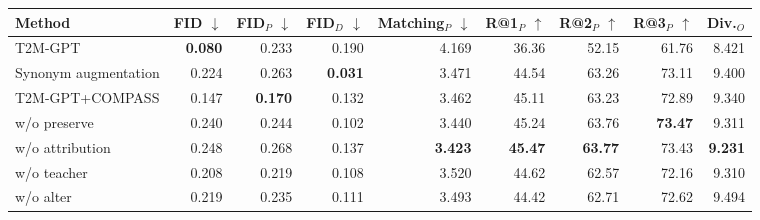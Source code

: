 \begin{tabular*}{\textwidth}{@{\extracolsep{\fill}}lrrrrrrrr@{}}
\toprule
Method & FID $\downarrow$ & FID$_P$ $\downarrow$ & FID$_D$ $\downarrow$ & Matching$_P$ $\downarrow$ & R@1$_P$ $\uparrow$ & R@2$_P$ $\uparrow$ & R@3$_P$ $\uparrow$ & Div.$_O$ \\
\midrule
T2M-GPT & \textbf{0.080} & 0.233 & 0.190 & 4.169 & 36.36 & 52.15 & 61.76 & 8.421 \\
Synonym augmentation & 0.224 & 0.263 & \textbf{0.031} & 3.471 & 44.54 & 63.26 & 73.11 & 9.400 \\
T2M-GPT+COMPASS & 0.147 & \textbf{0.170} & 0.132 & 3.462 & 45.11 & 63.23 & 72.89 & 9.340 \\
w/o preserve & 0.240 & 0.244 & 0.102 & 3.440 & 45.24 & 63.76 & \textbf{73.47} & 9.311 \\
w/o attribution & 0.248 & 0.268 & 0.137 & \textbf{3.423} & \textbf{45.47} & \textbf{63.77} & 73.43 & \textbf{9.231} \\
w/o teacher & 0.208 & 0.219 & 0.108 & 3.520 & 44.62 & 62.57 & 72.16 & 9.310 \\
w/o alter & 0.219 & 0.235 & 0.111 & 3.493 & 44.42 & 62.71 & 72.62 & 9.494 \\
\bottomrule
\end{tabular*}
